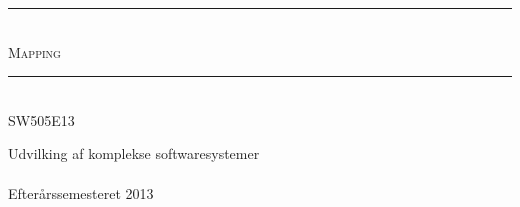 



\begin{titlepage}
\newcommand{\HRule}{\rule{\linewidth}{0.5mm}}

\begin{center}

\HRule \\[0.5cm]
\textsc{ \Huge Mapping}\\[0.3cm]

\HRule \\[1cm]

\textsc{\Large SW505E13}

\vfill
{\Large Udvilking af komplekse softwaresystemer}
\\ ~\\
{\large Efterårssemesteret 2013}

\end{center}
\end{titlepage}

\newpage\mbox{}\newpage

\tableofcontents



